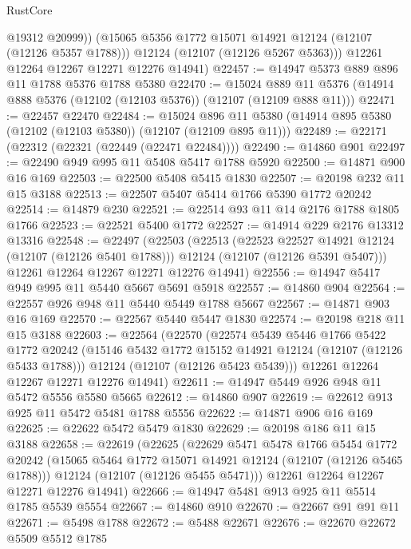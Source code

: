 \begin{lexlean}{RustCore}
\begin{coremodule}
            @19312
            @20999))
        (@15065 @5356 @1772 @15071 @14921 @12124 (@12107 (@12126 @5357 @1788)))
        @12124
        (@12107 (@12126 @5267 @5363)))
      @12261
      @12264
      @12267
      @12271
      @12276
      @14941)
@22457 := @14947 @5373 @889 @896 @11 @1788 @5376 @1788 @5380
@22470 := @15024
    @889
    @11
    @5376
    (@14914 @888 @5376 (@12102 (@12103 @5376)) (@12107 (@12109 @888 @11)))
@22471 := @22457 @22470
@22484 := @15024
    @896
    @11
    @5380
    (@14914 @895 @5380 (@12102 (@12103 @5380)) (@12107 (@12109 @895 @11)))
@22489 := @22171 (@22312 (@22321 (@22449 (@22471 @22484))))
@22490 := @14860 @901
@22497 := @22490 @949 @995 @11 @5408 @5417 @1788 @5920
@22500 := @14871 @900 @16 @169
@22503 := @22500 @5408 @5415 @1830
@22507 := @20198 @232 @11 @15 @3188
@22513 := @22507 @5407 @5414 @1766 @5390 @1772 @20242
@22514 := @14879 @230
@22521 := @22514 @93 @11 @14 @2176 @1788 @1805 @1766
@22523 := @22521 @5400 @1772
@22527 := @14914 @229 @2176 @13312 @13316
@22548 := @22497
    (@22503
      (@22513
        (@22523 @22527 @14921 @12124 (@12107 (@12126 @5401 @1788)))
        @12124
        (@12107 (@12126 @5391 @5407)))
      @12261
      @12264
      @12267
      @12271
      @12276
      @14941)
@22556 := @14947 @5417 @949 @995 @11 @5440 @5667 @5691 @5918
@22557 := @14860 @904
@22564 := @22557 @926 @948 @11 @5440 @5449 @1788 @5667
@22567 := @14871 @903 @16 @169
@22570 := @22567 @5440 @5447 @1830
@22574 := @20198 @218 @11 @15 @3188
@22603 := @22564
    (@22570
      (@22574
        @5439
        @5446
        @1766
        @5422
        @1772
        @20242
        (@15146 @5432 @1772 @15152 @14921 @12124 (@12107 (@12126 @5433 @1788)))
        @12124
        (@12107 (@12126 @5423 @5439)))
      @12261
      @12264
      @12267
      @12271
      @12276
      @14941)
@22611 := @14947 @5449 @926 @948 @11 @5472 @5556 @5580 @5665
@22612 := @14860 @907
@22619 := @22612 @913 @925 @11 @5472 @5481 @1788 @5556
@22622 := @14871 @906 @16 @169
@22625 := @22622 @5472 @5479 @1830
@22629 := @20198 @186 @11 @15 @3188
@22658 := @22619
    (@22625
      (@22629
        @5471
        @5478
        @1766
        @5454
        @1772
        @20242
        (@15065 @5464 @1772 @15071 @14921 @12124 (@12107 (@12126 @5465 @1788)))
        @12124
        (@12107 (@12126 @5455 @5471)))
      @12261
      @12264
      @12267
      @12271
      @12276
      @14941)
@22666 := @14947 @5481 @913 @925 @11 @5514 @1785 @5539 @5554
@22667 := @14860 @910
@22670 := @22667 @91 @91 @11
@22671 := @5498 @1788
@22672 := @5488 @22671
@22676 := @22670 @22672 @5509 @5512 @1785

\end{coremodule}
\end{lexlean}
